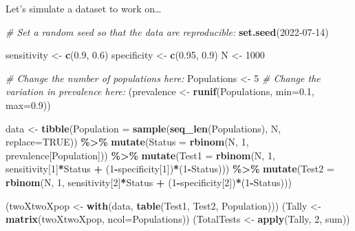 \documentclass[
  ignorenonframetext,
]{beamer}
\newenvironment{Shaded}{\begin{snugshade}}{\end{snugshade}}
\newcommand{\AttributeTok}[1]{\textcolor[rgb]{0.13,0.29,0.53}{#1}}
\newcommand{\CommentTok}[1]{\textcolor[rgb]{0.56,0.35,0.01}{\textit{#1}}}
\newcommand{\ConstantTok}[1]{\textcolor[rgb]{0.56,0.35,0.01}{#1}}
\newcommand{\DecValTok}[1]{\textcolor[rgb]{0.00,0.00,0.81}{#1}}
\newcommand{\FloatTok}[1]{\textcolor[rgb]{0.00,0.00,0.81}{#1}}
\newcommand{\FunctionTok}[1]{\textcolor[rgb]{0.13,0.29,0.53}{\textbf{#1}}}
\newcommand{\NormalTok}[1]{#1}
\newcommand{\OtherTok}[1]{\textcolor[rgb]{0.56,0.35,0.01}{#1}}
\newcommand{\SpecialCharTok}[1]{\textcolor[rgb]{0.81,0.36,0.00}{\textbf{#1}}}
\begin{document}
\begin{frame}[fragile]
Let's simulate a dataset to work on\ldots{}

\scriptsize

\begin{Shaded}
\begin{Highlighting}[]
\CommentTok{\# Set a random seed so that the data are reproducible:}
\FunctionTok{set.seed}\NormalTok{(}\DecValTok{2022{-}07{-}14}\NormalTok{)}

\NormalTok{sensitivity }\OtherTok{\textless{}{-}} \FunctionTok{c}\NormalTok{(}\FloatTok{0.9}\NormalTok{, }\FloatTok{0.6}\NormalTok{)}
\NormalTok{specificity }\OtherTok{\textless{}{-}} \FunctionTok{c}\NormalTok{(}\FloatTok{0.95}\NormalTok{, }\FloatTok{0.9}\NormalTok{)}
\NormalTok{N }\OtherTok{\textless{}{-}} \DecValTok{1000}

\CommentTok{\# Change the number of populations here:}
\NormalTok{Populations }\OtherTok{\textless{}{-}} \DecValTok{5}
\CommentTok{\# Change the variation in prevalence here:}
\NormalTok{(prevalence }\OtherTok{\textless{}{-}} \FunctionTok{runif}\NormalTok{(Populations, }\AttributeTok{min=}\FloatTok{0.1}\NormalTok{, }\AttributeTok{max=}\FloatTok{0.9}\NormalTok{))}

\NormalTok{data }\OtherTok{\textless{}{-}} \FunctionTok{tibble}\NormalTok{(}\AttributeTok{Population =} \FunctionTok{sample}\NormalTok{(}\FunctionTok{seq\_len}\NormalTok{(Populations), N, }\AttributeTok{replace=}\ConstantTok{TRUE}\NormalTok{)) }\SpecialCharTok{\%\textgreater{}\%}
  \FunctionTok{mutate}\NormalTok{(}\AttributeTok{Status =} \FunctionTok{rbinom}\NormalTok{(N, }\DecValTok{1}\NormalTok{, prevalence[Population])) }\SpecialCharTok{\%\textgreater{}\%}
  \FunctionTok{mutate}\NormalTok{(}\AttributeTok{Test1 =} \FunctionTok{rbinom}\NormalTok{(N, }\DecValTok{1}\NormalTok{, sensitivity[}\DecValTok{1}\NormalTok{]}\SpecialCharTok{*}\NormalTok{Status }\SpecialCharTok{+}\NormalTok{ (}\DecValTok{1}\SpecialCharTok{{-}}\NormalTok{specificity[}\DecValTok{1}\NormalTok{])}\SpecialCharTok{*}\NormalTok{(}\DecValTok{1}\SpecialCharTok{{-}}\NormalTok{Status))) }\SpecialCharTok{\%\textgreater{}\%}
  \FunctionTok{mutate}\NormalTok{(}\AttributeTok{Test2 =} \FunctionTok{rbinom}\NormalTok{(N, }\DecValTok{1}\NormalTok{, sensitivity[}\DecValTok{2}\NormalTok{]}\SpecialCharTok{*}\NormalTok{Status }\SpecialCharTok{+}\NormalTok{ (}\DecValTok{1}\SpecialCharTok{{-}}\NormalTok{specificity[}\DecValTok{2}\NormalTok{])}\SpecialCharTok{*}\NormalTok{(}\DecValTok{1}\SpecialCharTok{{-}}\NormalTok{Status)))}

\NormalTok{(twoXtwoXpop }\OtherTok{\textless{}{-}} \FunctionTok{with}\NormalTok{(data, }\FunctionTok{table}\NormalTok{(Test1, Test2, Population)))}
\NormalTok{(Tally }\OtherTok{\textless{}{-}} \FunctionTok{matrix}\NormalTok{(twoXtwoXpop, }\AttributeTok{ncol=}\NormalTok{Populations))}
\NormalTok{(TotalTests }\OtherTok{\textless{}{-}} \FunctionTok{apply}\NormalTok{(Tally, }\DecValTok{2}\NormalTok{, sum))}
\end{Highlighting}
\end{Shaded}

\normalsize
\end{frame}
\end{document}
